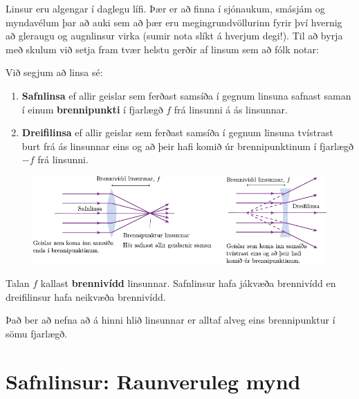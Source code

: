 Linsur eru algengar í daglegu lífi. Þær er að finna í sjónaukum, smásjám og myndavélum þar að auki sem að þær eru megingrundvöllurinn fyrir því hvernig að gleraugu og augnlinsur virka (sumir nota slíkt á hverjum degi!). Til að byrja með skulum við setja fram tvær helstu gerðir af linsum sem að fólk notar:

\begin{tcolorbox}
\begin{definition} Við segjum að linsa sé:
\begin{enumerate}[label = \textbf{(\roman*)}]
    \item \textbf{Safnlinsa} ef allir geislar sem ferðast samsíða í gegnum linsuna safnast saman í einum \textbf{brennipunkti} í fjarlægð $f$ frá linsunni á ás linsunnar.
    \item \textbf{Dreifilinsa} ef allir geislar sem ferðast samsíða í gegnum linsuna tvístrast burt frá ás linsunnar eins og að þeir hafi komið úr brennipunktinum í fjarlægð $-f$ frá linsunni.
\end{enumerate}
\begin{figure}[H]
    \centering
    \includegraphics{figures/dreifi-safn.pdf}
\end{figure}
Talan $f$ kallast \textbf{brennivídd} linsunnar. Safnlinsur hafa jákvæða brennivídd en dreifilinsur hafa neikvæða brennivídd.
\end{definition}
\end{tcolorbox}

Það ber að nefna að á hinni hlið linsunnar er alltaf alveg eins brennipunktur í sömu fjarlægð.

\section{Safnlinsur: Raunveruleg mynd}

